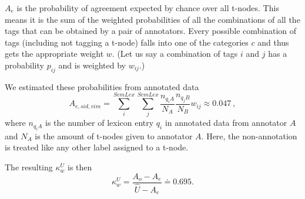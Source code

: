 $A_e$ is the probability of agreement expected by chance over all t-nodes. This means it is the sum of the weighted probabilities of all the combinations of all the tags that can be obtained by a pair of annotators. Every possible combination of tags (including not tagging a t-node) falls into one of the categories $c$ and thus gets the appropriate weight $w$. (Let us say a combination of tags $i$ and $j$ has a probability $p_{ij}$ and is weighted by $w_{ij}$.)
%

We estimated these probabilities from annotated data
\[
A_{e, sid, vim} = \sum_i^{SemLex} \sum_j^{SemLex}
	\frac{n_{q_iA}}{N_A} \frac{n_{q_jB}}{N_B} w_{ij} \approx 0.047\ ,
\]
where $n_{q_iA}$ is the number of lexicon entry $q_i$ in annotated data from annotator $A$ and $N_A$ is the amount of t-nodes given to annotator $A$. Here, the non-annotation is treated like any other label assigned to a t-node.

The resulting $\kappa_w^U$ is then
\[\kappa_w^U = \frac{A_o - A_e}{\widehat{U} - A_e} \doteq 0.695.\]


